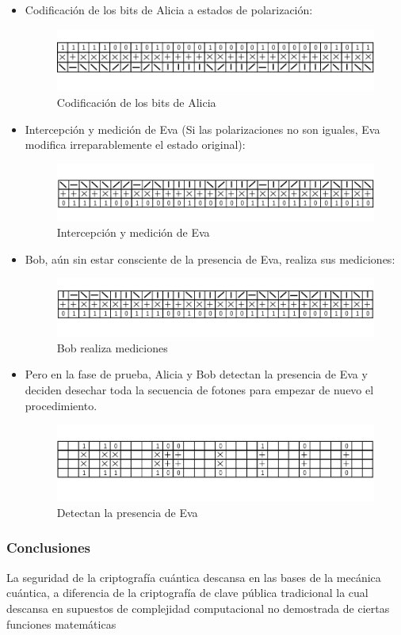 \documentclass[11pt, conference]{IEEEtran}
\begin{document}
\begin{itemize}
\item Codificación de los bits de Alicia a estados de polarización:

\begin{figure}[hbtp]
\centering
\includegraphics[scale=0.22]{7.png} 
\caption{Codificación de los bits de Alicia}
\end{figure}
\item Intercepción y medición de Eva (Si las polarizaciones no son iguales, Eva modifica irreparablemente el estado original):

\begin{figure}[hbtp]
\centering
\includegraphics[scale=0.22]{8.png} 
\caption{Intercepción y medición de Eva}
\end{figure}

\item Bob, aún sin estar consciente de la presencia de Eva, realiza sus mediciones:

\begin{figure}[hbtp]
\centering
\includegraphics[scale=0.22]{9.png} 
\caption{Bob realiza mediciones}
\end{figure}

\item Pero en la fase de prueba, Alicia y Bob detectan la presencia de Eva y deciden desechar toda la secuencia de fotones para empezar de nuevo el procedimiento.

\begin{figure}[hbtp]
\centering
\includegraphics[scale=0.22]{10.png} 
\caption{Detectan la presencia de Eva}
\end{figure}
\end{itemize}

\subsubsection{\bf Conclusiones}
La seguridad de la criptografía cuántica descansa en las bases de la mecánica cuántica, a diferencia de la criptografía de clave pública tradicional la cual descansa en supuestos de complejidad computacional no demostrada de ciertas funciones matemáticas
\end{document}
